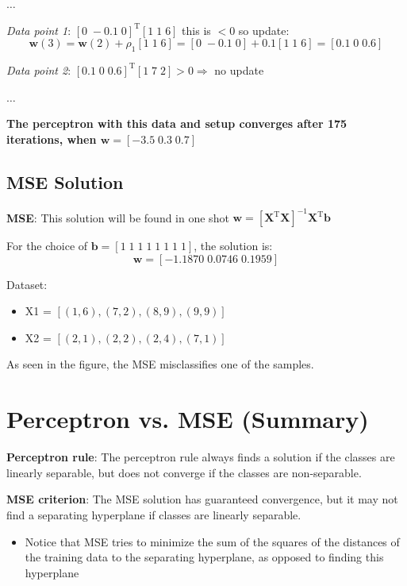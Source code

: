 \documentclass[11pt,a4paper]{article}
\theoremstyle{definition}
\theoremstyle{plain}
\theoremstyle{remark}
\begin{document}
$\ldots$

\textit{Data point 1}: $[0 \; -0.1 \; 0]^{\mathrm{T}} [1 \; 1 \; 6]$ this is $<0$ so update:
\[
\mathbf{w}(3) = \mathbf{w}(2) + \rho_1 [1 \; 1 \; 6] = [0 \; -0.1 \; 0] + 0.1[1 \; 1 \; 6] = [0.1 \; 0 \; 0.6]
\]

\textit{Data point 2}: $[0.1 \; 0 \; 0.6]^{\mathrm{T}} [1 \; 7 \; 2] > 0 \Rightarrow$ no update

$\ldots$

\textbf{The perceptron with this data and setup converges after 175 iterations, when $\mathbf{w} = [-3.5 \; 0.3 \; 0.7]$}

\subsection{MSE Solution}

\textbf{MSE}: This solution will be found in one shot $\mathbf{w} = [\mathbf{X}^{\mathrm{T}} \mathbf{X}]^{-1} \mathbf{X}^{\mathrm{T}} \mathbf{b}$

For the choice of $\mathbf{b} = [1 \; 1 \; 1 \; 1 \; 1 \; 1 \; 1 \; 1]$, the solution is:
\[
\mathbf{w} = [-1.1870 \; 0.0746 \; 0.1959]
\]

Dataset:
\begin{itemize}
    \item X1 = $[(1,6), (7,2), (8,9), (9,9)]$
    \item X2 = $[(2,1), (2,2), (2,4), (7,1)]$
\end{itemize}

As seen in the figure, the MSE misclassifies one of the samples.

\section{Perceptron vs. MSE (Summary)}

\begin{tcolorbox}[colback=blue!5!white,colframe=blue!75!black,title=\textbf{Comparison Summary}]
\textbf{Perceptron rule}: The perceptron rule always finds a solution if the classes are linearly separable, but does not converge if the classes are non-separable.

\textbf{MSE criterion}: The MSE solution has guaranteed convergence, but it may not find a separating hyperplane if classes are linearly separable.

\begin{itemize}
    \item Notice that MSE tries to minimize the sum of the squares of the distances of the training data to the separating hyperplane, as opposed to finding this hyperplane
\end{itemize}
\end{tcolorbox}
\end{document}
